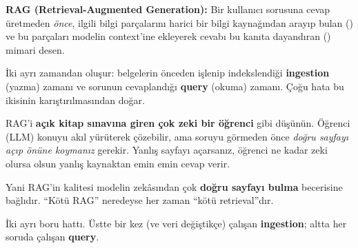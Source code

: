 \begin{problembox}
\textbf{RAG (Retrieval-Augmented Generation):} Bir kullanıcı sorusuna cevap
üretmeden \emph{önce}, ilgili bilgi parçalarını harici bir bilgi kaynağından
arayıp bulan () ve bu parçaları modelin context'ine ekleyerek
cevabı bu kanıta dayandıran () mimari desen.
\end{problembox}

İki ayrı zamandan oluşur: belgelerin önceden işlenip indekslendiği
\textbf{ingestion} (yazma) zamanı ve sorunun cevaplandığı \textbf{query} (okuma)
zamanı. Çoğu hata bu ikisinin karıştırılmasından doğar.

\begin{mentalbox}
RAG'i \textbf{açık kitap sınavına giren çok zeki bir öğrenci} gibi düşünün.
Öğrenci (LLM) konuyu akıl yürüterek çözebilir, ama soruyu görmeden önce
\emph{doğru sayfayı açıp önüne koymanız} gerekir. Yanlış sayfayı açarsanız,
öğrenci ne kadar zeki olursa olsun yanlış kaynaktan emin emin cevap verir.

\smallskip
Yani RAG'in kalitesi modelin zekâsından çok \textbf{doğru sayfayı bulma}
becerisine bağlıdır. ``Kötü RAG'' neredeyse her zaman ``kötü retrieval''dır.
\end{mentalbox}

İki ayrı boru hattı. Üstte bir kez (ve veri değiştikçe) çalışan
\textbf{ingestion}; altta her soruda çalışan \textbf{query}.

